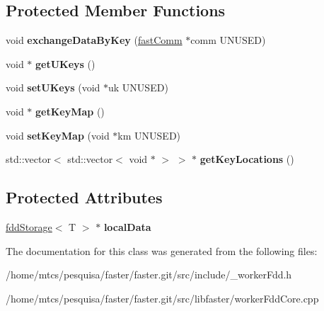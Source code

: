 \subsection*{Protected Member Functions}
\begin{DoxyCompactItemize}
\item 
\hypertarget{classfaster_1_1workerFddCore_a970f3471f714c359c0b9d7f50711726a}{}\label{classfaster_1_1workerFddCore_a970f3471f714c359c0b9d7f50711726a} 
void {\bfseries exchange\+Data\+By\+Key} (\hyperlink{classfaster_1_1fastComm}{fast\+Comm} $\ast$comm U\+N\+U\+S\+ED)
\item 
\hypertarget{classfaster_1_1workerFddCore_a680e4cf4f9702680b2c2d510798a3166}{}\label{classfaster_1_1workerFddCore_a680e4cf4f9702680b2c2d510798a3166} 
void $\ast$ {\bfseries get\+U\+Keys} ()
\item 
\hypertarget{classfaster_1_1workerFddCore_a79f382d37ac47873306241217b51e1e6}{}\label{classfaster_1_1workerFddCore_a79f382d37ac47873306241217b51e1e6} 
void {\bfseries set\+U\+Keys} (void $\ast$uk U\+N\+U\+S\+ED)
\item 
\hypertarget{classfaster_1_1workerFddCore_acb4598d5ac4ae60c646ab72f26d05db8}{}\label{classfaster_1_1workerFddCore_acb4598d5ac4ae60c646ab72f26d05db8} 
void $\ast$ {\bfseries get\+Key\+Map} ()
\item 
\hypertarget{classfaster_1_1workerFddCore_a27bcb7913c94c74f0b6254456db0265a}{}\label{classfaster_1_1workerFddCore_a27bcb7913c94c74f0b6254456db0265a} 
void {\bfseries set\+Key\+Map} (void $\ast$km U\+N\+U\+S\+ED)
\item 
\hypertarget{classfaster_1_1workerFddCore_a8b82124f0cf058974f73df7521a1aa80}{}\label{classfaster_1_1workerFddCore_a8b82124f0cf058974f73df7521a1aa80} 
std\+::vector$<$ std\+::vector$<$ void $\ast$ $>$ $>$ $\ast$ {\bfseries get\+Key\+Locations} ()
\end{DoxyCompactItemize}
\subsection*{Protected Attributes}
\begin{DoxyCompactItemize}
\item 
\hypertarget{classfaster_1_1workerFddCore_aba24c5db034dd1b8235b9ad4483c5e0e}{}\label{classfaster_1_1workerFddCore_aba24c5db034dd1b8235b9ad4483c5e0e} 
\hyperlink{classfaster_1_1fddStorage}{fdd\+Storage}$<$ T $>$ $\ast$ {\bfseries local\+Data}
\end{DoxyCompactItemize}


The documentation for this class was generated from the following files\+:\begin{DoxyCompactItemize}
\item 
/home/mtcs/pesquisa/faster/faster.\+git/src/include/\+\_\+worker\+Fdd.\+h\item 
/home/mtcs/pesquisa/faster/faster.\+git/src/libfaster/worker\+Fdd\+Core.\+cpp\end{DoxyCompactItemize}
